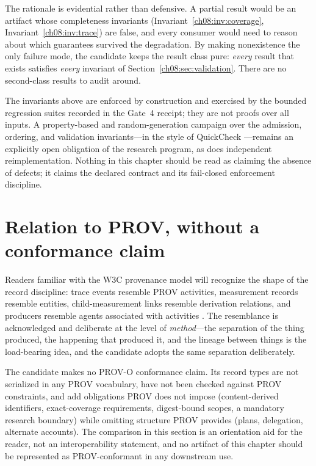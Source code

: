 The rationale is evidential rather than defensive. A partial result would be an artifact whose completeness invariants (Invariant~\ref{ch08:inv:coverage}, Invariant~\ref{ch08:inv:trace}) are false, and every consumer would need to reason about which guarantees survived the degradation. By making nonexistence the only failure mode, the candidate keeps the result class pure: \emph{every} result that exists satisfies \emph{every} invariant of Section~\ref{ch08:sec:validation}. There are no second-class results to audit around.

\begin{remark}\label{ch08:rem:testing}
The invariants above are enforced by construction and exercised by the bounded regression suites recorded in the Gate~4 receipt; they are not proofs over all inputs. A property-based and random-generation campaign over the admission, ordering, and validation invariants---in the style of QuickCheck \cite{quickcheck}---remains an explicitly open obligation of the research program, as does independent reimplementation. Nothing in this chapter should be read as claiming the absence of defects; it claims the declared contract and its fail-closed enforcement discipline.
\end{remark}

\section{Relation to PROV, without a conformance claim}\label{ch08:sec:prov}

Readers familiar with the W3C provenance model will recognize the shape of the record discipline: trace events resemble PROV activities, measurement records resemble entities, child-measurement links resemble derivation relations, and producers resemble agents associated with activities \cite{prov}. The resemblance is acknowledged and deliberate at the level of \emph{method}---the separation of the thing produced, the happening that produced it, and the lineage between things is the load-bearing idea, and the candidate adopts the same separation deliberately.

\begin{boundary}\label{ch08:bd:prov}
The candidate makes no PROV-O conformance claim. Its record types are not serialized in any PROV vocabulary, have not been checked against PROV constraints, and add obligations PROV does not impose (content-derived identifiers, exact-coverage requirements, digest-bound scopes, a mandatory research boundary) while omitting structure PROV provides (plans, delegation, alternate accounts). The comparison in this section is an orientation aid for the reader, not an interoperability statement, and no artifact of this chapter should be represented as PROV-conformant in any downstream use.
\end{boundary}

